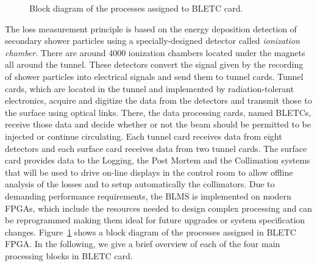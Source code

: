 \documentclass{llncs}
\begin{document}
\begin{figure}[t]
  \centering  {}
   \caption{Block diagram of the processes assigned to BLETC card.}
  \label{fig:BLETC}
\end{figure}

The loss measurement principle \cite{Dehning-IPAC,Chris-FPGA} is based on the energy deposition detection of secondary shower particles using a specially-designed detector called \emph{ionization chamber}. There are around 4000 ionization chambers located under the magnets all around the tunnel. These detectors convert the signal given by the recording of shower particles into electrical signals and send them to tunnel cards. Tunnel cards, which are located in the tunnel and implemented by radiation-tolerant electronics, acquire and digitize the data from the detectors and transmit those to the surface using optical links. There, the data processing cards, named BLETCs, receive those data and decide whether or not the beam should be permitted to be injected or continue circulating. Each tunnel card receives data from eight detectors and each surface card receives data from two tunnel cards. The surface card provides data to the Logging, the Post Mortem and the Collimation systems that will be used to drive on-line displays in the control room to allow offline analysis of the losses and to setup automatically the collimators. Due to demanding performance requirements, the BLMS is implemented on modern FPGAs, which include the resources needed to design complex processing and can be reprogrammed making them ideal for future upgrades or system specification changes. Figure~\ref{fig:BLETC} shows a block diagram of the processes assigned in BLETC FPGA. In the following, we give a brief overview of each of the four main processing blocks in BLETC card.
\end{document}
